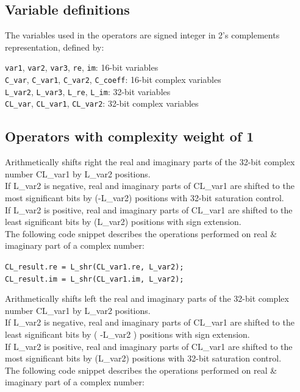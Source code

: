 \subsection{Variable definitions}

The variables used in the operators are signed integer in 2's complements representation, defined by:

{\tt var1}, {\tt var2}, {\tt var3}, {\tt re}, {\tt im}: 16-bit variables\\
{\tt C\_var}, {\tt C\_var1}, {\tt C\_var2}, {\tt C\_coeff}: 16-bit complex variables\\
{\tt L\_var2}, {\tt L\_var3}, {\tt L\_re}, {\tt L\_im}: 32-bit variables\\
{\tt CL\_var}, {\tt CL\_var1}, {\tt CL\_var2}: 32-bit complex variables

\subsection{Operators with complexity weight of 1}


Arithmetically shifts right the real and imaginary parts of the 32-bit complex number CL\_var1 by L\_var2 positions.\\
If L\_var2 is negative, real and imaginary parts of CL\_var1 are shifted to the most significant bits by (-L\_var2) positions with 32-bit saturation control.\\
If L\_var2 is positive, real and imaginary parts of CL\_var1 are shifted to the least significant bits by (L\_var2) positions with sign extension.\\
The following code snippet describes the operations performed on real \& imaginary part of a complex number:

{\tt {}CL\_result.re = L\_shr(CL\_var1.re, L\_var2);\\
CL\_result.im = L\_shr(CL\_var1.im, L\_var2);\\
}


Arithmetically shifts left the real and imaginary parts of the 32-bit complex number CL\_var1 by L\_var2 positions.\\
If L\_var2 is negative, real and imaginary parts of CL\_var1 are shifted to the least significant bits by ( -L\_var2 ) positions with sign extension.\\
If L\_var2 is positive, real and imaginary parts of CL\_var1 are shifted to the most significant bits by (L\_var2) positions with 32-bit saturation control.\\
The following code snippet describes the operations performed on real \& imaginary part of a complex number:


